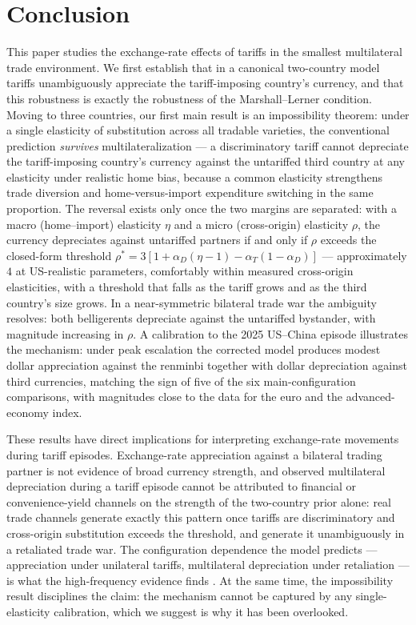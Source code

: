 \documentclass[11pt]{article}
\theoremstyle{plain}
\theoremstyle{remark}
\numberwithin{lemma}{section}
\numberwithin{proposition}{section}
\numberwithin{corollary}{section}
\newenvironment{revblock}{\par\begingroup\color{RevBlue}}{\endgroup\par}
\begin{document}
\section{Conclusion}
\label{sec:conclusion}

\begin{revblock}
This paper studies the exchange-rate effects of tariffs in the smallest multilateral trade environment. We first establish that in a canonical two-country model tariffs unambiguously appreciate the tariff-imposing country's currency, and that this robustness is exactly the robustness of the Marshall--Lerner condition. Moving to three countries, our first main result is an impossibility theorem: under a single elasticity of substitution across all tradable varieties, the conventional prediction \emph{survives} multilateralization --- a discriminatory tariff cannot depreciate the tariff-imposing country's currency against the untariffed third country at any elasticity under realistic home bias, because a common elasticity strengthens trade diversion and home-versus-import expenditure switching in the same proportion. The reversal exists only once the two margins are separated: with a macro (home--import) elasticity $\eta$ and a micro (cross-origin) elasticity $\rho$, the currency depreciates against untariffed partners if and only if $\rho$ exceeds the closed-form threshold $\rho^* = 3[1 + \alpha_D(\eta-1) - \alpha_T(1-\alpha_D)]$ --- approximately $4$ at US-realistic parameters, comfortably within measured cross-origin elasticities, with a threshold that falls as the tariff grows and as the third country's size grows. In a near-symmetric bilateral trade war the ambiguity resolves: both belligerents depreciate against the untariffed bystander, with magnitude increasing in $\rho$. A calibration to the 2025 US--China episode illustrates the mechanism: under peak escalation the corrected model produces modest dollar appreciation against the renminbi together with dollar depreciation against third currencies, matching the sign of five of the six main-configuration comparisons, with magnitudes close to the data for the euro and the advanced-economy index.

These results have direct implications for interpreting exchange-rate movements during tariff episodes. Exchange-rate appreciation against a bilateral trading partner is not evidence of broad currency strength, and observed multilateral depreciation during a tariff episode cannot be attributed to financial or convenience-yield channels on the strength of the two-country prior alone: real trade channels generate exactly this pattern once tariffs are discriminatory and cross-origin substitution exceeds the threshold, and generate it unambiguously in a retaliated trade war. The configuration dependence the model predicts --- appreciation under unilateral tariffs, multilateral depreciation under retaliation --- is what the high-frequency evidence finds \citep{corsetti2025}. At the same time, the impossibility result disciplines the claim: the mechanism cannot be captured by any single-elasticity calibration, which we suggest is why it has been overlooked.
\end{revblock}
\end{document}
